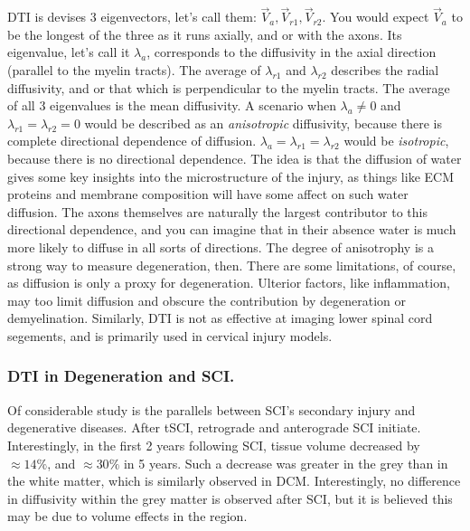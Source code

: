 \documentclass[12pt]{report}
\begin{document}
DTI is devises 3 eigenvectors, let's call them: $\vec{V}_{a}, \vec{V}_{r1}, \vec{V}_{r2}$. You would expect $\vec{V}_{a}$ to be the longest of the three as it runs axially, and or with the axons. Its eigenvalue, let's call it $\lambda_a$, corresponds to the diffusivity in the axial direction (parallel to the myelin tracts). The average of $\lambda_{r1}$ and $\lambda_{r2}$ describes the radial diffusivity, and or that which is perpendicular to the myelin tracts. The average of all 3 eigenvalues is the mean diffusivity. A scenario when $\lambda_a \neq 0$ and $\lambda_{r1} = \lambda_{r2} = 0$ would be described as an \textit{anisotropic} diffusivity, because there is complete directional dependence of diffusion. $\lambda_a = \lambda_{r1} = \lambda_{r2}$ would be \textit{isotropic}, because there is no directional dependence. The idea is that the diffusion of water gives some key insights into the microstructure of the injury, as things like ECM proteins and membrane composition will have some affect on such water diffusion. The axons themselves are naturally the largest contributor to this directional dependence, and you can imagine that in their absence water is much more likely to diffuse in all sorts of directions. The degree of anisotrophy is a strong way to measure degeneration, then. There are some limitations, of course, as diffusion is only a proxy for degeneration. Ulterior factors, like inflammation, may too limit diffusion and obscure the contribution by degeneration or demyelination. Similarly, DTI is not as effective at imaging lower spinal cord segements, and is primarily used in cervical injury models.

\subsubsection{DTI in Degeneration and SCI.}

Of considerable study is the parallels between SCI's secondary injury and degenerative diseases. After tSCI, retrograde and anterograde SCI initiate. Interestingly, in the first 2 years following SCI, tissue volume decreased by $\approx 14\%$, and $\approx 30\%$ in 5 years. Such a decrease was greater in the grey than in the white matter, which is similarly observed in DCM. Interestingly, no difference in diffusivity within the grey matter is observed after SCI, but it is believed this may be due to volume effects in the region.\newline
\end{document}
